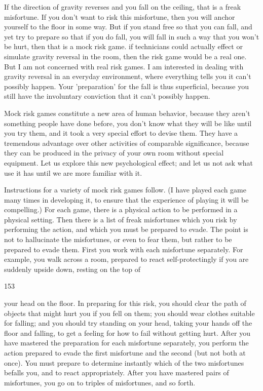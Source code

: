 \documentclass[10pt,twoside]{memoir}
\begin{document}
\begin{enumerate}
{\begin{enumerate}
\begin{sysrules}
\begin{sysrules}
\begin{sysrules}
\begin{sysrules}
{\begin{enumerate}
{{{{{{If the direction of gravity reverses and you fall on the ceiling, that is a 
freak misfortune. If you don't want to risk this misfortune, then you will 
anchor yourself to the floor in some way. But if you stand free so that you 
can fall, and yet try to prepare so that if you do fall, you will fall in such a 
way that you won't be hurt, then that is a mock risk game. if technicians 
could actually effect or simulate gravity reversal in the room, then the risk 
game would be a real one. But I am not concerned with real risk games. I am 
interested in dealing with gravity reversal in an everyday environment, where 
everything tells you it can't possibly happen. Your 'preparation' for the fall 
is thus superficial, because you still have the involuntary conviction that it 
can't possibly happen. 

Mock risk games constitute a new area of human behavior, because they 
aren't something people have done before, you don't know what they will be 
like until you try them, and it took a very special effort to devise them. 
They have a tremendous advantage over other activities of comparable 
significance, because they can be produced in the privacy of your own room 
without special equipment. Let us explore this new psychological effect; and 
let us not ask what use it has until we are more familiar with it. 

Instructions for a variety of mock risk games follow. (I have played 
each game many times in developing it, to ensure that the experience of 
playing it will be compelling.) For each game, there is a physical action to be 
performed in a physical setting. Then there is a list of freak misfortunes 
which you risk by performing the action, and which you must be prepared 
to evade. The point is not to hallucinate the misfortunes, or even to fear 
them, but rather to be prepared to evade them. First you work with each 
misfortune separately. For example, you walk across a room, prepared to 
react self-protectingly if you are suddenly upside down, resting on the top of 


153 


your head on the floor. In preparing for this risk, you should clear the path 
of objects that might hurt you if you fell on them; you should wear clothes 
suitable for falling; and you should try standing on your head, taking your 
hands off the floor and falling, to get a feeling for how to fail without 
getting hurt. After you have mastered the preparation for each misfortune 
separately, you perform the action prepared to evade the first misfortune 
and the second (but not both at once). You must prepare to determine 
instantly which of the two misfortunes befalls you, and to react 
appropriately. After you have mastered pairs of misfortunes, you go on to 
triples of misfortunes, and so forth. 

}}}}}}
\end{enumerate}}
\end{sysrules}
\end{sysrules}
\end{sysrules}
\end{sysrules}
\end{enumerate}}
\end{enumerate}
\end{document}

